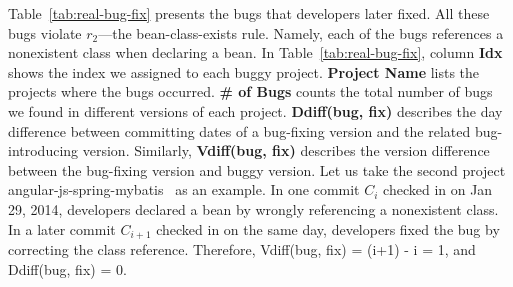 Table~\ref{tab:real-bug-fix} presents 
the %
\totalRealBugs bugs that developers later fixed.
All these bugs violate $r_2$---the bean-class-exists rule. Namely, each of the bugs references a nonexistent class when declaring a bean.
In Table~\ref{tab:real-bug-fix}, 
 column \textbf{Idx} shows the index we assigned to each buggy project. \textbf{Project Name} lists the projects where the bugs occurred. \textbf{\# of Bugs} counts the total number of bugs we found in different versions of each project. \textbf{Ddiff(bug, fix)} describes the day difference between committing dates of a bug-fixing version and the related bug-introducing version. Similarly, \textbf{Vdiff(bug, fix)} describes the version difference between the bug-fixing version and buggy version. Let us take the second project angular-js-spring-mybatis~\cite{angular} as an example. In one commit $C_i$ checked in on %
 {Jan 29, 2014}, {developers declared a bean by wrongly referencing a nonexistent class.} In a later commit $C_{i+1}$ checked in on the same day, developers fixed the bug by {correcting the class reference}. Therefore, Vdiff(bug, fix) = (i+1) - i = 1, and Ddiff(bug, fix) = 0. 

